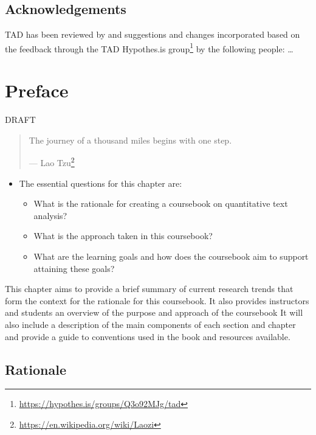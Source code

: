 \documentclass[
]{article}
\DeclareRobustCommand{\href}[2]{#2\footnote{\url{#1}}}
\providecommand{\tightlist}{%
  \setlength{\itemsep}{0pt}\setlength{\parskip}{0pt}}
\newenvironment{rmdblock}[1]
  {\begin{shaded*}
  \begin{itemize}
  \renewcommand{\labelitemi}{
    \raisebox{-.5\height}[0pt][0pt]{
      {\setkeys{Gin}{width=2em,keepaspectratio}\texttt{[image: assets/images/\#1]}}
    }
  }
  \item
  }
  {
  \end{itemize}
  \end{shaded*}
  }
\newenvironment{rmdkey}
  {\begin{rmdblock}{key}}
  {\end{rmdblock}}
\begin{document}
\hypertarget{acknowledgements}{%
\subsection*{Acknowledgements}\label{acknowledgements}}

TAD has been reviewed by and suggestions and changes incorporated based on the feedback through \href{https://hypothes.is/groups/Q3o92MJg/tad}{the TAD Hypothes.is group} by the following people: \ldots{}

\hypertarget{preface}{%
\section*{Preface}\label{preface}}

DRAFT

\begin{quote}
The journey of a thousand miles begins with one step.

--- \href{https://en.wikipedia.org/wiki/Laozi}{Lao Tzu}
\end{quote}

\begin{rmdkey}
The essential questions for this chapter are:

\begin{itemize}
\tightlist
\item
  What is the rationale for creating a coursebook on quantitative text
  analysis?
\item
  What is the approach taken in this coursebook?
\item
  What are the learning goals and how does the coursebook aim to support
  attaining these goals?
\end{itemize}
\end{rmdkey}

This chapter aims to provide a brief summary of current research trends that form the context for the rationale for this coursebook. It also provides instructors and students an overview of the purpose and approach of the coursebook It will also include a description of the main components of each section and chapter and provide a guide to conventions used in the book and resources available.

\hypertarget{rationale}{%
\subsection*{Rationale}\label{rationale}}
\end{document}
